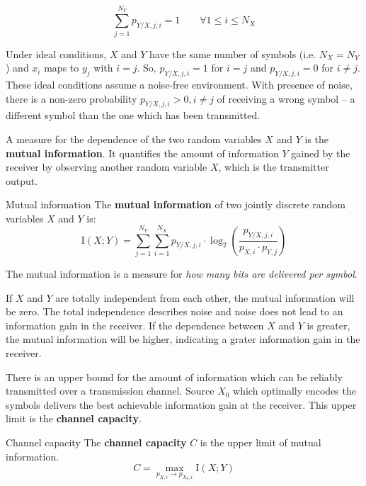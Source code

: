 \begin{refsection}
\begin{equation}
	\sum\limits_{j = 1}^{N_Y} p_{Y/X,j,i} = 1 \qquad \forall 1 \leq i \leq N_X
\end{equation}

Under ideal conditions, $X$ and $Y$ have the same number of symbols (i.e. $N_X = N_Y$) and $x_i$ maps to $y_j$ with $i = j$. So, $p_{Y/X,j,i} = 1$ for $i = j$ and $p_{Y/X,j,i} = 0$ for $i \neq j$. These ideal conditions assume a noise-free environment. With presence of noise, there is a non-zero probability $p_{Y/X,j,i} > 0, i \neq j$ of receiving a wrong symbol -- a different symbol than the one which has been transmitted.

A measure for the dependence of the two random variables $X$ and $Y$ is the  \textbf{mutual information}. It quantifies the amount of information $Y$ gained by the receiver by observing another random variable $X$, which is the transmitter output.

\begin{definition}{Mutual information}
	The  \textbf{mutual information} of two jointly discrete random variables $X$ and $Y$ is:
	\begin{equation}
		\mathrm{I}\left(X; Y\right) = \sum\limits_{j = 1}^{N_Y} \sum\limits_{i = 1}^{N_X} p_{Y/X,j,i} \cdot \log_2 \left(\frac{p_{Y/X,j,i}}{p_{X,i} \cdot p_{Y,j}}\right)
	\end{equation}%
	
	The mutual information is a measure for \emph{how many bits are delivered per symbol}.
\end{definition}

If $X$ and $Y$ are totally independent from each other, the mutual information will be zero. The total independence describes noise and noise does not lead to an information gain in the receiver. If the dependence between $X$ and $Y$ is greater, the mutual information will be higher, indicating a grater information gain in the receiver.

There is an upper bound for the amount of information which can be reliably transmitted over a transmission channel. Source $X_0$ which optimally encodes the symbols delivers the best achievable information gain at the receiver. This upper limit is the  \textbf{channel capacity}.

\begin{definition}{Channel capacity}
	The  \textbf{channel capacity} $C$ is the upper limit of mutual information.
	\begin{equation}
		C = \max\limits_{p_{X,i} \rightarrow p_{X_0,i}} \mathrm{I}\left(X; Y\right)
	\end{equation}
\end{definition}


\end{refsection}
